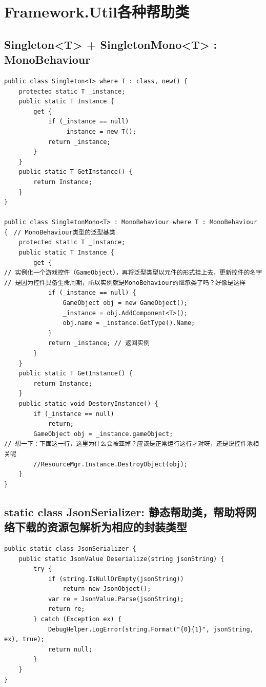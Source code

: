 \documentclass[9pt, b5paper]{article}
\begin{document}
\section{Framework.Util各种帮助类}
\label{sec-9}
\subsection{Singleton<T> + SingletonMono<T> : MonoBehaviour}
\label{sec-9-1}
\begin{verbatim}
public class Singleton<T> where T : class, new() {
    protected static T _instance;
    public static T Instance {
        get {
            if (_instance == null) 
                _instance = new T();
            return _instance;
        }
    }
    public static T GetInstance() {
        return Instance;
    }
}

public class SingletonMono<T> : MonoBehaviour where T : MonoBehaviour {　// MonoBehaviour类型的泛型基类
    protected static T _instance;
    public static T Instance {
        get {
// 实例化一个游戏控件（GameObject），再将泛型类型以元件的形式挂上去，更新控件的名字
// 是因为控件具备生命周期，所以实例就是MonoBehaviour的继承类了吗？好像是这样
            if (_instance == null) {　
                GameObject obj = new GameObject();
                _instance = obj.AddComponent<T>();
                obj.name = _instance.GetType().Name;
            }
            return _instance; // 返回实例
        }
    }
    public static T GetInstance() {
        return Instance;
    }
    public static void DestoryInstance() {
        if (_instance == null)
            return;
        GameObject obj = _instance.gameObject;
// 想一下：下面这一行，这里为什么会被亚掉？应该是正常运行这行才对呀，还是说控件池相关呢
        //ResourceMgr.Instance.DestroyObject(obj);　
    }
}
\end{verbatim}

\subsection{static class JsonSerializer: 静态帮助类，帮助将网络下载的资源包解析为相应的封装类型}
\label{sec-9-2}
\begin{verbatim}
public static class JsonSerializer {
    public static JsonValue Deserialize(string jsonString) {
        try {
            if (string.IsNullOrEmpty(jsonString)) 
                return new JsonObject();
            var re = JsonValue.Parse(jsonString);
            return re;
        } catch (Exception ex) {
            DebugHelper.LogError(string.Format("{0}{1}", jsonString, ex), true);
            return null;
        }
    }
}
\end{verbatim}
\end{document}

